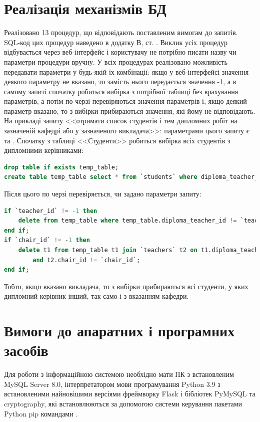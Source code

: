 \section{Реалізація механізмів БД}
Реалізовано 13 процедур, що відповідають поставленим вимогам до запитів.
SQL-код цих процедур наведено в додатку В, ст. \pageref{queries}. Виклик усіх процедур
відбувається через веб-інтерфейс і користувачу не потрібно писати назву чи параметри процедури вручну.
У всіх процедурах реалізовано можливість передавати параметри у будь-якій їх комбінації: якщо у веб-інтерфейсі
значення деякого параметру не вказано, то замість нього передається значення -1, а в самому запиті спочатку робиться вибірка з потрібної
таблиці без врахування параметрів, а потім по черзі перевіряються значення параметрів і, якщо деякий параметр вказано, то з вибірки
прибираються значення, які йому не відповідають.
На прикладі запиту <<отримати список студентів і тем дипломних робіт на зазначеній кафедрі або у зазначеного викладача>>:
параметрами цього запиту є  та . Спочатку з таблиці <<Студенти>> робиться вибірка
всіх студентів з дипломними керівниками:
\begin{lstlisting}[language=SQL, style=code]
drop table if exists temp_table;
create table temp_table select * from `students` where diploma_teacher_id is not NULL;
\end{lstlisting}
Після цього по черзі перевіряється, чи задано параметри запиту:
\begin{lstlisting}[language=SQL, style=code]
if `teacher_id` != -1 then
	delete from temp_table where temp_table.diploma_teacher_id != `teacher_id`;
end if;
if `chair_id` != -1 then
	delete t1 from temp_table t1 join `teachers` t2 on t1.diploma_teacher_id = t2.teacher_id
        and t2.chair_id != `chair_id`;
end if;
\end{lstlisting}
Тобто, якщо вказано викладача, то з вибірки прибираються всі студенти, у яких дипломний керівник інший, так само і з вказанням
кафедри.
\section{Вимоги до апаратних і програмних засобів}
Для роботи з інформаційною системою необхідно мати ПК з встановленим MySQL Server 8.0, інтерпретатором мови програмування Python 3.9 з
встановленими найновішими версіями фреймворку Flask і бібліотек PyMySQL та cryptography, які встановлюються за допомогою
системи керування пакетами Python pip командами .

